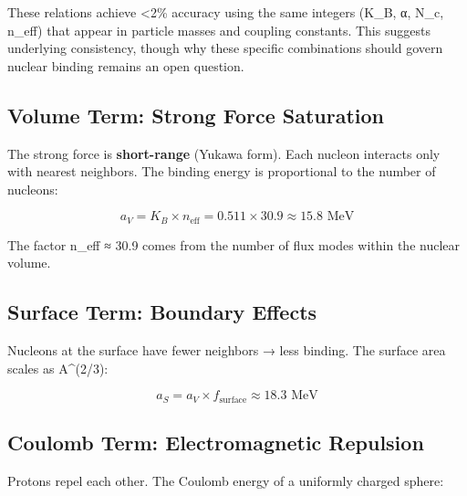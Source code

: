 \documentclass[
  11pt,
  letterpaper,
  twoside,
  openright]{book}
\begin{document}
\begin{tcolorbox}[enhanced jigsaw, leftrule=.75mm, title=\textcolor{quarto-callout-note-color}{\faInfo}\hspace{0.5em}{Consistency, Not Derivation}, bottomrule=.15mm, opacityback=0, coltitle=black, arc=.35mm, colframe=quarto-callout-note-color-frame, colbacktitle=quarto-callout-note-color!10!white, colback=white, titlerule=0mm, breakable, bottomtitle=1mm, toptitle=1mm, rightrule=.15mm, toprule=.15mm, left=2mm, opacitybacktitle=0.6]

These relations achieve \textless2\% accuracy using the same integers
(K\_B, α, N\_c, n\_eff) that appear in particle masses and coupling
constants. This suggests underlying consistency, though why these
specific combinations should govern nuclear binding remains an open
question.

\end{tcolorbox}

\subsection{Volume Term: Strong Force
Saturation}\label{volume-term-strong-force-saturation}

The strong force is \textbf{short-range} (Yukawa form). Each nucleon
interacts only with nearest neighbors. The binding energy is
proportional to the number of nucleons:

\[a_V = K_B \times n_{\text{eff}} = 0.511 \times 30.9 \approx 15.8 \text{ MeV}\]

The factor n\_eff ≈ 30.9 comes from the number of flux modes within the
nuclear volume.

\subsection{Surface Term: Boundary
Effects}\label{surface-term-boundary-effects}

Nucleons at the surface have fewer neighbors → less binding. The surface
area scales as A\^{}(2/3):

\[a_S = a_V \times f_{\text{surface}} \approx 18.3 \text{ MeV}\]

\subsection{Coulomb Term: Electromagnetic
Repulsion}\label{coulomb-term-electromagnetic-repulsion}

Protons repel each other. The Coulomb energy of a uniformly charged
sphere:
\end{document}

